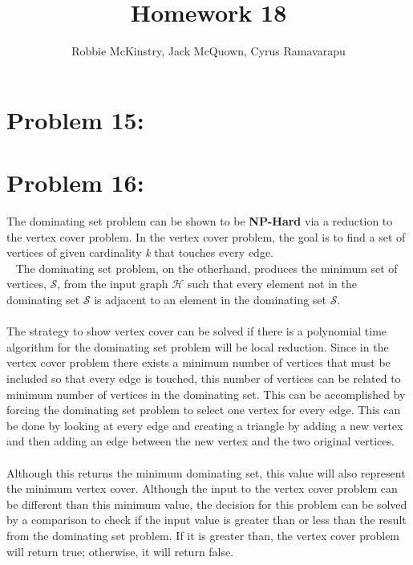 \documentclass[12pt]{article}
\begin{document}
\title{Homework 18}
\author{Robbie McKinstry, Jack McQuown, Cyrus Ramavarapu}
\renewcommand{\today}{12 October 2016}
\renewcommand{\baselinestretch}{1.5}
\maketitle

\section*{Problem 15: }
\section*{Problem 16: }
The dominating set problem can be shown to be \textbf{NP-Hard} via 
a reduction to the vertex cover problem.  In the vertex cover problem,
the goal is to find a set of vertices of given cardinality \textit{k} 
that touches every edge.\\\
The dominating set problem, on the otherhand, produces the minimum set 
of vertices, $\mathcal{S}$, from the input graph $\mathcal{H}$ such that every element
not in the dominating set $\mathcal{S}$ is adjacent to an element in the
dominating set $\mathcal{S}$.\\\\
The strategy to show vertex cover can be solved if there is a polynomial time 
algorithm for the dominating set problem will be local reduction.  Since in the
vertex cover problem there exists a minimum number of vertices that must be
included so that every edge is touched, this number of vertices can be related
to minimum number of vertices in the dominating set.  This can be accomplished by
forcing the dominating set problem to select one vertex for every edge.  This can
be done by looking at every edge and creating a triangle by adding a new vertex
and then adding an edge between the new vertex and the two original vertices.\\\\
Although this returns the minimum dominating set, this value will also represent
the minimum vertex cover.  Although the input to the vertex cover problem can be
different than this minimum value, the decision for this problem can be solved
by a comparison to check if the input value is greater than or less than the
result from the dominating set problem.  If it is greater than, the vertex cover
problem will return true; otherwise, it will return false.\\\\
\end{document}
